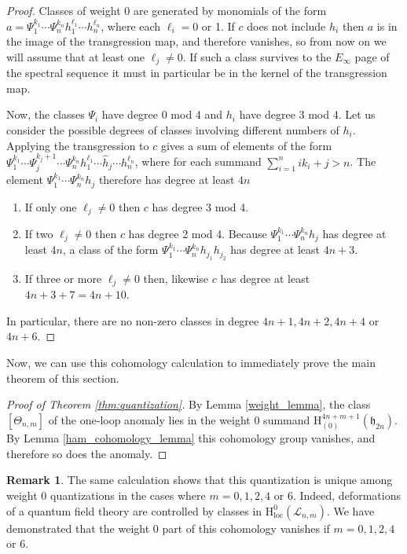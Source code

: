 \documentclass[11pt, oneside, reqno]{amsart}
\theoremstyle{definition} \newtheorem{definition}{Definition}[section]
\theoremstyle{definition}
\theoremstyle{remark}
\theoremstyle{definition} \newtheorem{remark}[definition]{Remark}
\theoremstyle{definition} \newtheorem{remarks}[definition]{Remarks}
\theoremstyle{definition} \newtheorem{question}[definition]{Question}
\theoremstyle{definition} \newtheorem*{note}{Note}
\theoremstyle{definition} \newtheorem{example}[definition]{Example}
\theoremstyle{definition} \newtheorem{examples}[definition]{Examples}
\newcommand{\mr}[1]{\mathrm{#1}}
\newcommand{\mc}[1]{\mathcal{#1}}
\newcommand{\mf}[1]{\mathfrak{#1}}
\begin{document}
\begin{proof}
Classes of weight $0$ are generated by monomials of the form $a = \Psi_1^{k_1} \cdots \Psi_n^{k_n} h_1^{\ell_1} \cdots h_n^{\ell_n}$, where each $\ell_i = 0$ or 1.  If $c$ does not include $h_i$ then $a$ is in the image of the transgression map, and therefore vanishes, so from now on we will assume that at least one $\ell_j \ne 0$.  If such a class survives to the $E_\infty$ page of the spectral sequence it must in particular be in the kernel of the transgression map.  

Now, the classes $\Psi_i$ have degree 0 mod 4 and $h_i$ have degree 3 mod 4.  Let us consider the possible degrees of classes involving different numbers of $h_i$.  Applying the transgression to $c$ gives a sum of elements of the form $\Psi_1^{k_1} \cdots \Psi_j^{k_j+1} \cdots \Psi_n^{k_n} h_1^{\ell_1} \cdots \hat h_j \cdots h_n^{\ell_n}$, where for each summand $\sum_{i=1}^n i k_i + j > n$.  The element $\Psi_1^{k_1} \cdots \Psi_n^{k_n} h_j$ therefore has degree at least $4n$
\begin{enumerate}
 \item If only one $\ell_j \ne 0$ then $c$ has degree 3 mod 4.
 \item If two $\ell_j \ne 0$ then $c$ has degree 2 mod 4.  Because $\Psi_1^{k_1} \cdots \Psi_n^{k_n} h_j$ has degree at least $4n$, a class of the form $\Psi_1^{k_1} \cdots \Psi_n^{k_n} h_{j_1} h_{j_2}$ has degree at least $4n + 3$.
 \item If three or more $\ell_j \ne 0$ then, likewise $c$ has degree at least $4n + 3 + 7 = 4n + 10$.
\end{enumerate}
In particular, there are no non-zero classes in degree $4n+1, 4n+2, 4n+4$ or $4n+6$.
\end{proof}

Now, we can use this cohomology calculation to immediately prove the main theorem of this section.
\begin{proof}[Proof of Theorem \ref{thm:quantization}]
By Lemma \ref{weight_lemma}, the class $[\Theta_{n,m}]$ of the one-loop anomaly lies in the weight 0 summand $\mr H_{(0)}^{4n+m+1}(\mf{h}_{2n})$.  
By Lemma \ref{ham_cohomology_lemma} this cohomology group vanishes, and therefore so does the anomaly.
\end{proof}

\begin{remark}
The same calculation shows that this quantization is unique among weight 0 quantizations in the cases where $m=0,1,2,4$ or $6$.  Indeed, deformations of a quantum field theory are controlled by classes in $\mr H^0_{\mr{loc}}(\mc L_{n,m})$.  We have demonstrated that the weight 0 part of this cohomology vanishes if $m=0,1,2,4$ or $6$.
\end{remark}
\end{document}
